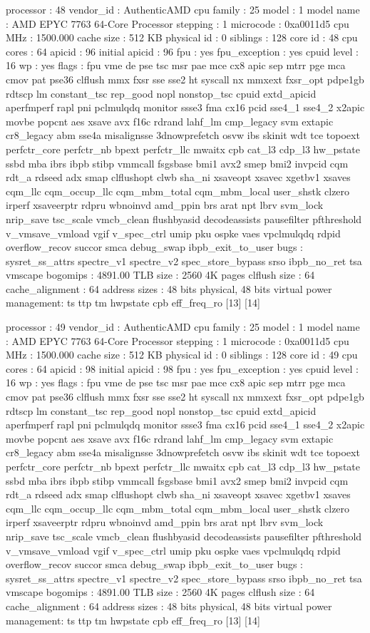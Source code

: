 processor	: 48
vendor_id	: AuthenticAMD
cpu family	: 25
model		: 1
model name	: AMD EPYC 7763 64-Core Processor
stepping	: 1
microcode	: 0xa0011d5
cpu MHz		: 1500.000
cache size	: 512 KB
physical id	: 0
siblings	: 128
core id		: 48
cpu cores	: 64
apicid		: 96
initial apicid	: 96
fpu		: yes
fpu_exception	: yes
cpuid level	: 16
wp		: yes
flags		: fpu vme de pse tsc msr pae mce cx8 apic sep mtrr pge mca cmov pat pse36 clflush mmx fxsr sse sse2 ht syscall nx mmxext fxsr_opt pdpe1gb rdtscp lm constant_tsc rep_good nopl nonstop_tsc cpuid extd_apicid aperfmperf rapl pni pclmulqdq monitor ssse3 fma cx16 pcid sse4_1 sse4_2 x2apic movbe popcnt aes xsave avx f16c rdrand lahf_lm cmp_legacy svm extapic cr8_legacy abm sse4a misalignsse 3dnowprefetch osvw ibs skinit wdt tce topoext perfctr_core perfctr_nb bpext perfctr_llc mwaitx cpb cat_l3 cdp_l3 hw_pstate ssbd mba ibrs ibpb stibp vmmcall fsgsbase bmi1 avx2 smep bmi2 invpcid cqm rdt_a rdseed adx smap clflushopt clwb sha_ni xsaveopt xsavec xgetbv1 xsaves cqm_llc cqm_occup_llc cqm_mbm_total cqm_mbm_local user_shstk clzero irperf xsaveerptr rdpru wbnoinvd amd_ppin brs arat npt lbrv svm_lock nrip_save tsc_scale vmcb_clean flushbyasid decodeassists pausefilter pfthreshold v_vmsave_vmload vgif v_spec_ctrl umip pku ospke vaes vpclmulqdq rdpid overflow_recov succor smca debug_swap ibpb_exit_to_user
bugs		: sysret_ss_attrs spectre_v1 spectre_v2 spec_store_bypass srso ibpb_no_ret tsa vmscape
bogomips	: 4891.00
TLB size	: 2560 4K pages
clflush size	: 64
cache_alignment	: 64
address sizes	: 48 bits physical, 48 bits virtual
power management: ts ttp tm hwpstate cpb eff_freq_ro [13] [14]

processor	: 49
vendor_id	: AuthenticAMD
cpu family	: 25
model		: 1
model name	: AMD EPYC 7763 64-Core Processor
stepping	: 1
microcode	: 0xa0011d5
cpu MHz		: 1500.000
cache size	: 512 KB
physical id	: 0
siblings	: 128
core id		: 49
cpu cores	: 64
apicid		: 98
initial apicid	: 98
fpu		: yes
fpu_exception	: yes
cpuid level	: 16
wp		: yes
flags		: fpu vme de pse tsc msr pae mce cx8 apic sep mtrr pge mca cmov pat pse36 clflush mmx fxsr sse sse2 ht syscall nx mmxext fxsr_opt pdpe1gb rdtscp lm constant_tsc rep_good nopl nonstop_tsc cpuid extd_apicid aperfmperf rapl pni pclmulqdq monitor ssse3 fma cx16 pcid sse4_1 sse4_2 x2apic movbe popcnt aes xsave avx f16c rdrand lahf_lm cmp_legacy svm extapic cr8_legacy abm sse4a misalignsse 3dnowprefetch osvw ibs skinit wdt tce topoext perfctr_core perfctr_nb bpext perfctr_llc mwaitx cpb cat_l3 cdp_l3 hw_pstate ssbd mba ibrs ibpb stibp vmmcall fsgsbase bmi1 avx2 smep bmi2 invpcid cqm rdt_a rdseed adx smap clflushopt clwb sha_ni xsaveopt xsavec xgetbv1 xsaves cqm_llc cqm_occup_llc cqm_mbm_total cqm_mbm_local user_shstk clzero irperf xsaveerptr rdpru wbnoinvd amd_ppin brs arat npt lbrv svm_lock nrip_save tsc_scale vmcb_clean flushbyasid decodeassists pausefilter pfthreshold v_vmsave_vmload vgif v_spec_ctrl umip pku ospke vaes vpclmulqdq rdpid overflow_recov succor smca debug_swap ibpb_exit_to_user
bugs		: sysret_ss_attrs spectre_v1 spectre_v2 spec_store_bypass srso ibpb_no_ret tsa vmscape
bogomips	: 4891.00
TLB size	: 2560 4K pages
clflush size	: 64
cache_alignment	: 64
address sizes	: 48 bits physical, 48 bits virtual
power management: ts ttp tm hwpstate cpb eff_freq_ro [13] [14]

